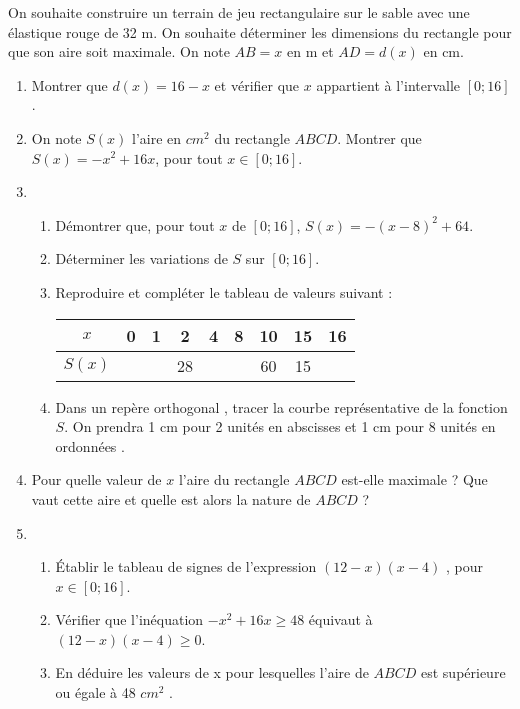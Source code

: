 
On souhaite construire un terrain de jeu
rectangulaire sur le sable avec une élastique
rouge de 32 m.
On souhaite déterminer les dimensions du
rectangle pour que son aire soit maximale.
On note $AB = x$ en m et $AD = d (x)$ en cm.
\begin{enumerate}
\item Montrer que $d (x) = 16 - x$ et vérifier que $x$ appartient à l'intervalle $[ 0;16 ]$.
\item  On note $S(x)$ l’aire en $cm^2$ du rectangle $ABCD$. Montrer que $S(x) = -x^2 + 16x$, pour tout $x \in [0;16]$.
\item  \begin{enumerate}
		\item Démontrer que, pour tout $x$ de $[ 0 ; 16 ]$, $S(x)= - ( x - 8)^2 + 64$.
		\item  Déterminer les variations de $S$ sur $[0 ; 16]$.
		\item  Reproduire et compléter le tableau de valeurs suivant :
		\begin{tabular}{|c|c|c|c|c|c|c|c|c|}
		\hline 
		$x$ & 0 & 1 & 2 & 4 & 8 & 10 & 15 & 16 \\ 
		\hline 
		$S(x)$ &  &  & 28 &  & & 60 & 15 &  \\ 
		\hline 
		\end{tabular}		
		\item  Dans un repère orthogonal , tracer la courbe représentative de la fonction $S$.
On prendra 1 cm pour 2 unités en abscisses et 1 cm pour 8 unités en ordonnées .
 		\end{enumerate}
\item Pour quelle valeur de $x$ l’aire du rectangle $ABCD$ est-elle maximale ? Que vaut cette aire et quelle est alors la nature de $ABCD$ ? 		
 \item 
\begin{enumerate}
		\item Établir le tableau de signes de l’expression $( 12 -x )( x - 4 )$ , pour $x \in [0;16]$.
		\item Vérifier que l'inéquation $-x^2 + 16x \geq 48$ équivaut à $( 12 - x )( x - 4 )\geq0 $. 
		\item  En déduire les valeurs de x pour lesquelles l'aire de $ABCD$ est supérieure ou égale à 48 $cm^2$ .
 \end{enumerate} 			
 \end{enumerate}